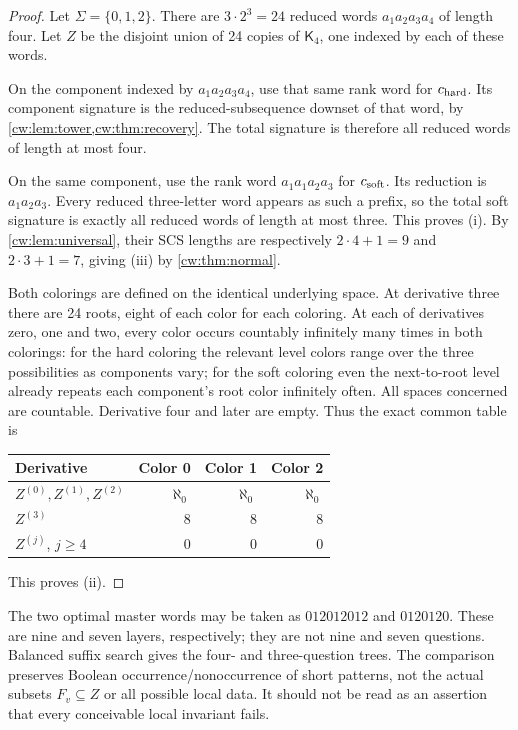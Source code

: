 \documentclass[11pt,letterpaper]{article}
\numberwithin{equation}{section}
\theoremstyle{definition}
\theoremstyle{remark}
\theoremstyle{definition}
\newcommand{\Tw}{\mathsf K}
\begin{document}
\begin{proof}
Let $\Sigma=\{0,1,2\}$. There are $3\cdot2^3=24$ reduced words
$a_1a_2a_3a_4$ of length four. Let $Z$ be the disjoint union of 24 copies
of $\Tw_4$, one indexed by each of these words.

On the component indexed by $a_1a_2a_3a_4$, use that same rank word for
$c_{\rm hard}$. Its component signature is the reduced-subsequence downset
of that word, by \cref{cw:lem:tower,cw:thm:recovery}. The total signature is
therefore all reduced words of length at most four.

On the same component, use the rank word $a_1a_1a_2a_3$ for
$c_{\rm soft}$. Its reduction is $a_1a_2a_3$. Every reduced three-letter
word appears as such a prefix, so the total soft signature is exactly all
reduced words of length at most three. This proves (i). By
\cref{cw:lem:universal}, their SCS lengths are respectively $2\cdot4+1=9$
and $2\cdot3+1=7$, giving (iii) by \cref{cw:thm:normal}.

Both colorings are defined on the identical underlying space. At derivative
three there are 24 roots, eight of each color for each coloring. At each
of derivatives zero, one and two, every color occurs countably infinitely
many times in both colorings: for the hard coloring the relevant level
colors range over the three possibilities as components vary; for the soft
coloring even the next-to-root level already repeats each component's root
color infinitely often. All spaces concerned are countable. Derivative four
and later are empty. Thus the exact common table is
\begin{center}
\begin{tabular}{@{}lrrr@{}}
\toprule
Derivative & Color 0 & Color 1 & Color 2\\
\midrule
$Z^{(0)},Z^{(1)},Z^{(2)}$ & $\aleph_0$ & $\aleph_0$ & $\aleph_0$\\
$Z^{(3)}$ & 8 & 8 & 8\\
$Z^{(j)}$, $j\ge4$ & 0 & 0 & 0\\
\bottomrule
\end{tabular}
\end{center}
This proves (ii).
\end{proof}

The two optimal master words may be taken as $012012012$ and $0120120$.
These are nine and seven layers, respectively; they are not nine and seven
questions. Balanced suffix search gives the four- and three-question trees.
The comparison preserves Boolean occurrence/nonoccurrence of short patterns,
not the actual subsets $F_v\subseteq Z$ or all possible local data. It should
not be read as an assertion that every conceivable local invariant fails.
\end{document}
